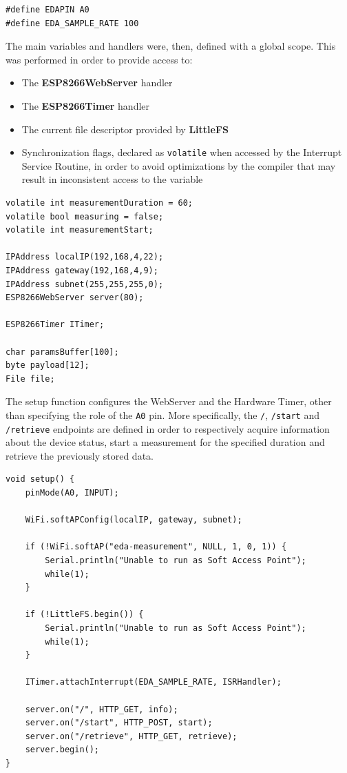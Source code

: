 \begin{verbatim}
#define EDAPIN A0
#define EDA_SAMPLE_RATE 100
\end{verbatim}

The main variables and handlers were, then, defined with a global scope. This was performed in order to provide access to:

\begin{itemize}
    \item The \textbf{ESP8266WebServer} handler
    \item The \textbf{ESP8266Timer} handler
    \item The current file descriptor provided by \textbf{LittleFS}
    \item Synchronization flags, declared as \texttt{volatile} when accessed by the Interrupt Service Routine, in order to avoid optimizations by the compiler that may result in inconsistent access to the variable
\end{itemize}


\begin{verbatim}
volatile int measurementDuration = 60;
volatile bool measuring = false;
volatile int measurementStart;

IPAddress localIP(192,168,4,22);
IPAddress gateway(192,168,4,9);
IPAddress subnet(255,255,255,0);
ESP8266WebServer server(80);

ESP8266Timer ITimer;

char paramsBuffer[100];
byte payload[12];
File file;
\end{verbatim}

The setup function configures the WebServer and the Hardware Timer, other than specifying the role of the \texttt{A0} pin. More specifically, the \texttt{/}, \texttt{/start} and \texttt{/retrieve} endpoints are defined in order to respectively acquire information about the device status, start a measurement for the specified duration and retrieve the previously stored data.

\begin{verbatim}
void setup() {
    pinMode(A0, INPUT);

    WiFi.softAPConfig(localIP, gateway, subnet);
    
    if (!WiFi.softAP("eda-measurement", NULL, 1, 0, 1)) {
        Serial.println("Unable to run as Soft Access Point");
        while(1);
    }

    if (!LittleFS.begin()) {
        Serial.println("Unable to run as Soft Access Point");
        while(1);
    }

    ITimer.attachInterrupt(EDA_SAMPLE_RATE, ISRHandler);

    server.on("/", HTTP_GET, info);
    server.on("/start", HTTP_POST, start);
    server.on("/retrieve", HTTP_GET, retrieve);
    server.begin();
}
\end{verbatim}

